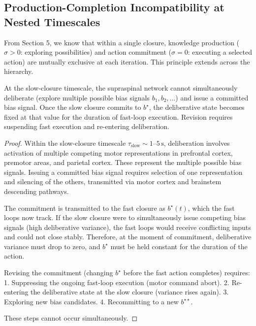 \subsection{Production-Completion Incompatibility at Nested Timescales}

From Section 5, we know that within a single closure, knowledge production ($\sigma > 0$: exploring possibilities) and action commitment ($\sigma = 0$: executing a selected action) are mutually exclusive at each iteration. This principle extends across the hierarchy.

\begin{theorem}
\label{thm:hierarchical-incompatibility}
At the slow-closure timescale, the supraspinal network cannot simultaneously deliberate (explore multiple possible bias signals $b_1, b_2, \ldots$) and issue a committed bias signal. Once the slow closure commits to $b^{\star}$, the deliberative state becomes fixed at that value for the duration of fast-loop execution. Revision requires suspending fast execution and re-entering deliberation.
\end{theorem}

\begin{proof}
Within the slow-closure timescale $\tau_{\text{slow}} \sim 1\text{--}5\,\text{s}$, deliberation involves activation of multiple competing motor representations in prefrontal cortex, premotor areas, and parietal cortex. These represent the multiple possible bias signals. Issuing a committed bias signal requires selection of one representation and silencing of the others, transmitted via motor cortex and brainstem descending pathways.

The commitment is transmitted to the fast closure as $b^{\star}(t)$, which the fast loops now track. If the slow closure were to simultaneously issue competing bias signals (high deliberative variance), the fast loops would receive conflicting inputs and could not close stably. Therefore, at the moment of commitment, deliberative variance must drop to zero, and $b^{\star}$ must be held constant for the duration of the action.

Revising the commitment (changing $b^{\star}$ before the fast action completes) requires:
1. Suppressing the ongoing fast-loop execution (motor command abort).
2. Re-entering the deliberative state at the slow closure (variance rises again).
3. Exploring new bias candidates.
4. Recommitting to a new $b^{\star\star}$.

These steps cannot occur simultaneously.
\end{proof}

